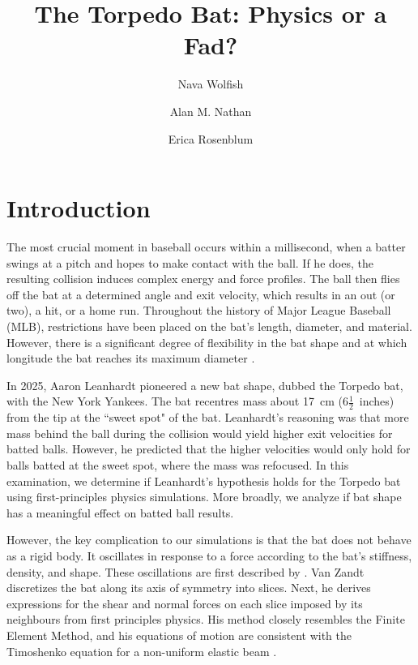 \documentclass[linenumbers]{aastex7}
\begin{document}
\title{The Torpedo Bat: Physics or a Fad?}

\author{Nava Wolfish}


\author{Alan M. Nathan}

\author{Erica Rosenblum}
\begin{abstract}


\end{abstract}

\keywords{}

\section{Introduction}
The most crucial moment in baseball occurs within a millisecond, when a batter swings at a pitch and hopes to make contact with the ball. If he does, the resulting collision induces complex energy and force profiles. The ball then flies off the bat at a determined angle and exit velocity, which results in an out (or two), a hit, or a home run. Throughout the history of Major League Baseball (MLB), restrictions have been placed on the bat's length, diameter, and material. However, there is a significant degree of flexibility in the bat shape and at which longitude the bat reaches its maximum diameter \citep{BaseballRules}.

In 2025, Aaron Leanhardt pioneered a new bat shape, dubbed the Torpedo bat, with the New York Yankees. The bat recentres mass about 17~cm (\(6\tfrac{1}{2}\)~inches) from the tip at the ``sweet spot" of the bat. Leanhardt's reasoning was that more mass behind the ball during the collision would yield higher exit velocities for batted balls. However, he predicted that the higher velocities would only hold for balls batted at the sweet spot, where the mass was refocused. %
In this examination, we determine if Leanhardt's hypothesis holds for the Torpedo bat using first-principles physics simulations. More broadly, we analyze if bat shape has a meaningful effect on batted ball results.

However, the key complication to our simulations is that the bat does not behave as a rigid body. It oscillates in response to a force according to the bat's stiffness, density, and shape. These oscillations are first described by \citet{vanzandtDynamicalTheoryBaseball1992}. Van Zandt discretizes the bat along its axis of symmetry into slices. Next, he derives expressions for the shear and normal forces on each slice imposed by its neighbours from first principles physics. His method closely resembles the Finite Element Method, and his equations of motion are consistent with the Timoshenko equation for a non-uniform elastic beam \citep{reddyIntroductionFiniteElement1993}.
\end{document}
